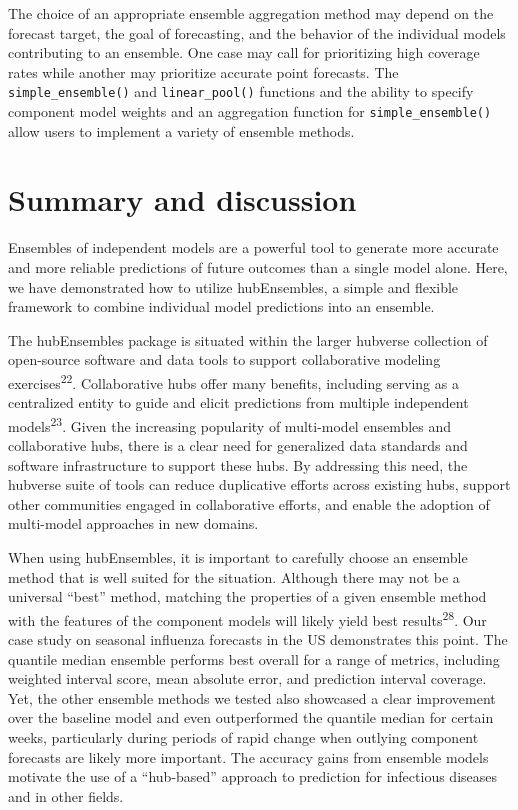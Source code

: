 \documentclass[
  letterpaper,
  DIV=11,
  numbers=noendperiod]{scrartcl}
\begin{document}
The choice of an appropriate ensemble aggregation method may depend on
the forecast target, the goal of forecasting, and the behavior of the
individual models contributing to an ensemble. One case may call for
prioritizing high coverage rates while another may prioritize accurate
point forecasts. The \texttt{simple\_ensemble()} and
\texttt{linear\_pool()} functions and the ability to specify component
model weights and an aggregation function for
\texttt{simple\_ensemble()} allow users to implement a variety of
ensemble methods.

\section{Summary and discussion}\label{sec-conclusions}

Ensembles of independent models are a powerful tool to generate more
accurate and more reliable predictions of future outcomes than a single
model alone. Here, we have demonstrated how to utilize {hubEnsembles}, a
simple and flexible framework to combine individual model predictions
into an ensemble.

The {hubEnsembles} package is situated within the larger hubverse
collection of open-source software and data tools to support
collaborative modeling exercises\textsuperscript{22}. Collaborative hubs
offer many benefits, including serving as a centralized entity to guide
and elicit predictions from multiple independent
models\textsuperscript{23}. Given the increasing popularity of
multi-model ensembles and collaborative hubs, there is a clear need for
generalized data standards and software infrastructure to support these
hubs. By addressing this need, the hubverse suite of tools can reduce
duplicative efforts across existing hubs, support other communities
engaged in collaborative efforts, and enable the adoption of multi-model
approaches in new domains.

When using {hubEnsembles}, it is important to carefully choose an
ensemble method that is well suited for the situation. Although there
may not be a universal ``best'' method, matching the properties of a
given ensemble method with the features of the component models will
likely yield best results\textsuperscript{28}. Our case study on
seasonal influenza forecasts in the US demonstrates this point. The
quantile median ensemble performs best overall for a range of metrics,
including weighted interval score, mean absolute error, and prediction
interval coverage. Yet, the other ensemble methods we tested also
showcased a clear improvement over the baseline model and even
outperformed the quantile median for certain weeks, particularly during
periods of rapid change when outlying component forecasts are likely
more important. The accuracy gains from ensemble models motivate the use
of a ``hub-based'' approach to prediction for infectious diseases and in
other fields.
\end{document}
